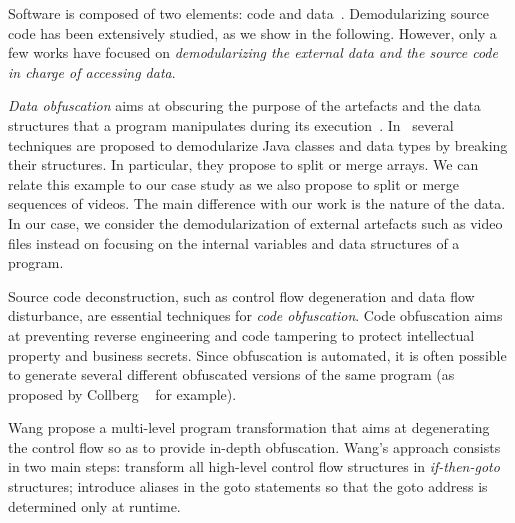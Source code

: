 
Software is composed of two elements: code and data~\cite{WirthAlgorithms}.
Demodularizing source code has been extensively studied, as we show in the following. However, only a few works have focused on \emph{demodularizing the external data and the source code in charge of accessing data}. 

\emph{Data obfuscation} aims at obscuring the purpose of the artefacts and the data structures that a program manipulates during its execution~\cite{naumovich2003preventing}.
In~\cite{collberg1998breaking} several techniques are proposed to demodularize Java classes and data types by breaking their structures. In particular, they propose to split or merge arrays. We can relate this example to our case study as we also propose to split or merge sequences of videos.
The main difference with our work is the nature of the data. In our case, we consider the demodularization of external artefacts such as video files instead on focusing on the internal variables and data structures of a program.

Source code deconstruction, such as control flow degeneration and data flow disturbance, are essential techniques for \emph{code obfuscation}. Code obfuscation aims at preventing reverse engineering and code tampering to protect intellectual property and business secrets.
 Since obfuscation is automated, it is often possible to generate several different obfuscated versions of the same program (as proposed by Collberg \etal~\cite{collberg12} for example).

Wang \etal \cite{wang01} propose a multi-level program transformation that aims at degenerating  the control flow so as to provide in-depth obfuscation. %
Wang's approach consists in two main steps: transform all high-level control flow structures in \emph{if-then-goto} structures; introduce aliases in the goto statements so that the goto address is determined only at runtime.


